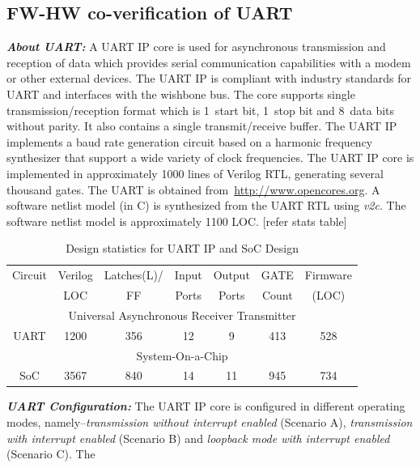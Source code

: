 \documentclass[sigconf]{acmart}
\newcommand{\rmcmt}[1]{{\color{magenta} [{#1}]}}
\begin{document}
\subsection{FW-HW co-verification of UART}

\textbf{\emph{About UART:}} A UART IP core is used for asynchronous
transmission and reception of data which provides serial communication
capabilities with a modem or other external devices.  The UART IP is
compliant with industry standards for UART and interfaces with the wishbone
bus.  The core supports single transmission/reception format which is
1~start bit, 1~stop bit and 8~data bits without parity.  It also contains a
single transmit/receive buffer.  The UART IP implements a baud rate
generation circuit based on a harmonic frequency synthesizer that support a
wide variety of clock frequencies.  The UART IP core is implemented in
approximately 1000 lines of Verilog RTL, generating several thousand gates. 
The UART is obtained from~\url{http://www.opencores.org}.  A software
netlist model (in C) is synthesized from the UART RTL using \emph{v2c}.  The
software netlist model is approximately 1100 LOC.
\rmcmt{refer stats table}
%
\begin{table}
\begin{center}
{
\scriptsize
\begin{tabular}{|c|c|c|c|c|c|c|}
\hline
  Circuit & Verilog & Latches(L)/ & Input & Output & GATE & Firmware \\
  & LOC & FF & Ports & Ports & Count & (LOC)\\ 
\cline{1-7}
\multicolumn{7}{|c|}{Universal Asynchronous Receiver Transmitter} \\ \hline 
  UART & 1200 & 356 & 12 & 9 & 413 & 528 \\ \hline
\multicolumn{7}{|c|}{System-On-a-Chip} \\ \hline 
  SoC & 3567 & 840 & 14 & 11 & 945 & 734 \\ \hline
\end{tabular}
}
\end{center}
\caption{Design statistics for UART IP and SoC Design}
\label{table:stats}
\end{table}  
%
\textbf{\emph{UART Configuration:}} The UART IP core is configured in
different operating modes, namely--{\em transmission without interrupt
enabled} (Scenario A), {\em transmission with interrupt enabled} (Scenario
B) and {\em loopback mode with interrupt enabled} (Scenario C).  The
\end{document}
